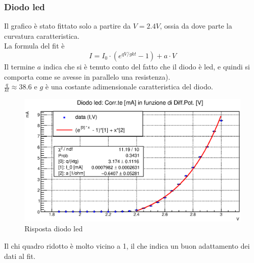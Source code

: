 \subsubsection{Diodo led}




Il grafico è stato fittato solo a partire da $V = 2.4 V$, ossia da dove parte la curvatura caratteristica.\\
La formula del fit è
$$ I = I_0 \cdot (e^{qV/gkt} -1) + a\cdot V $$
Il termine $a$ indica che si è tenuto conto del fatto che il diodo è led, e quindi si comporta come se avesse in parallelo una resistenza).\\
$  \frac{q}{kt} \approx 38.6 $ e $g$ è una costante adimensionale caratteristica del diodo.

\begin{figure}[H]
\centering
\includegraphics[scale=.7]{Grafici/C1_P3.eps}
\caption{
Risposta diodo led
}
\label{fig:C1_P3}
\end{figure}
%
%
Il chi quadro ridotto è molto vicino a 1, il che indica un buon adattamento dei dati al fit.